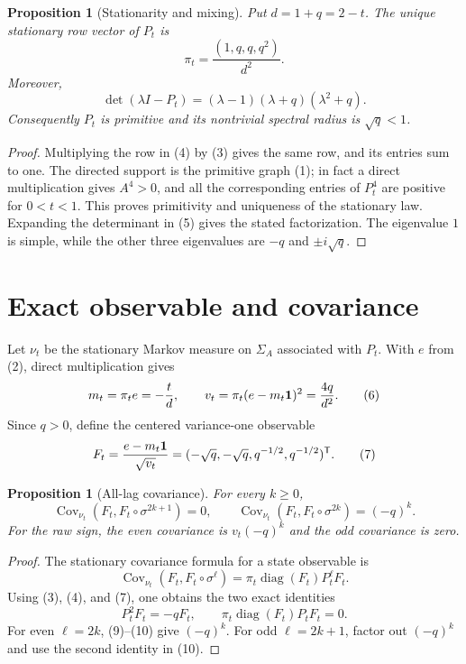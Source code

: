 \documentclass[11pt]{article}
\newtheorem{proposition}[theorem]{Proposition}
\newcommand{\SigmaA}{\Sigma_A}
\newcommand{\Cov}{\operatorname{Cov}}
\begin{document}
\begin{proposition}[Stationarity and mixing]
\label{prop:mixing}
Put $d=1+q=2-t$.  The unique stationary row vector of $P_t$ is
\[
 \pi_t=\frac{(1,q,q,q^2)}{d^2}. \tag{4}
\]
Moreover,
\[
 \det(\lambda I-P_t)=(\lambda-1)(\lambda+q)(\lambda^2+q). \tag{5}
\]
Consequently $P_t$ is primitive and its nontrivial spectral radius is
$\sqrt q<1$.
\end{proposition}

\begin{proof}
Multiplying the row in (4) by (3) gives the same row, and its entries sum to
one.  The directed support is the primitive graph (1); in fact a direct
multiplication gives $A^4>0$, and all the corresponding entries of $P_t^4$
are positive for $0<t<1$.  This proves primitivity and uniqueness of the
stationary law.  Expanding the determinant in (5) gives the stated
factorization.  The eigenvalue $1$ is simple, while the other three
eigenvalues are $-q$ and $\pm i\sqrt q$.
\end{proof}

\section{Exact observable and covariance}

Let $\nu_t$ be the stationary Markov measure on $\SigmaA$ associated with
$P_t$.  With $e$ from (2), direct multiplication gives
\[
 m_t=\pi_t e=-\frac{t}{d},\qquad
 v_t=\pi_t(e-m_t{\bf 1})^2=\frac{4q}{d^2}. \tag{6}
\]
Since $q>0$, define the centered variance-one observable
\[
 F_t=\frac{e-m_t{\bf 1}}{\sqrt{v_t}}
 =(-\sqrt q,-\sqrt q,q^{-1/2},q^{-1/2})^{\mathsf T}. \tag{7}
\]

\begin{proposition}[All-lag covariance]
\label{prop:cov}
For every $k\geq0$,
\[
 \Cov_{\nu_t}(F_t,F_t\circ\sigma^{2k+1})=0,\qquad
 \Cov_{\nu_t}(F_t,F_t\circ\sigma^{2k})=(-q)^k. \tag{8}
\]
For the raw sign, the even covariance is $v_t(-q)^k$ and the odd
covariance is zero.
\end{proposition}

\begin{proof}
The stationary covariance formula for a state observable is
\[
 \Cov_{\nu_t}(F_t,F_t\circ\sigma^\ell)
 =\pi_t\operatorname{diag}(F_t)P_t^\ell F_t. \tag{9}
\]
Using (3), (4), and (7), one obtains the two exact identities
\[
 P_t^2F_t=-qF_t,\qquad
 \pi_t\operatorname{diag}(F_t)P_tF_t=0. \tag{10}
\]
For even $\ell=2k$, (9)--(10) give $(-q)^k$.  For odd
$\ell=2k+1$, factor out $(-q)^k$ and use the second identity in (10).
\end{proof}
\end{document}
